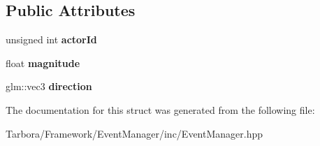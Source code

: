 \subsection*{Public Attributes}
\begin{DoxyCompactItemize}
\item 
\mbox{\label{structTarbora_1_1ApplyTorqueEvent_ad2a24a41b0c8a2c4edf0b4420fd37bd8}} 
unsigned int {\bfseries actor\+Id}
\item 
\mbox{\label{structTarbora_1_1ApplyTorqueEvent_a3862a5180635b8f5a4ea187e3b2990ed}} 
float {\bfseries magnitude}
\item 
\mbox{\label{structTarbora_1_1ApplyTorqueEvent_a76d76d71191e36e72f478050a7041865}} 
glm\+::vec3 {\bfseries direction}
\end{DoxyCompactItemize}


The documentation for this struct was generated from the following file\+:\begin{DoxyCompactItemize}
\item 
Tarbora/\+Framework/\+Event\+Manager/inc/Event\+Manager.\+hpp\end{DoxyCompactItemize}
